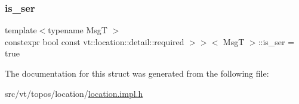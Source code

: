 \subsubsection{\texorpdfstring{is\+\_\+ser}{is\_ser}}
{\footnotesize\ttfamily template$<$typename MsgT $>$ \\
constexpr bool const vt\+::location\+::detail\+::required $>$$>$$<$ MsgT $>$\+::is\+\_\+ser = true\hspace{0.3cm}{\ttfamily [static]}}



The documentation for this struct was generated from the following file\+:\begin{DoxyCompactItemize}
\item 
src/vt/topos/location/\hyperlink{location_8impl_8h}{location.\+impl.\+h}\end{DoxyCompactItemize}
